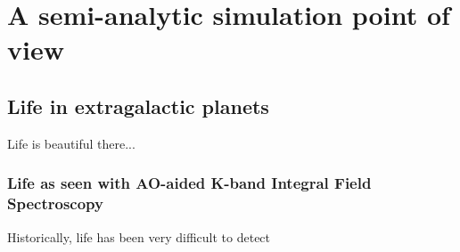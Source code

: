 \chapter{A semi-analytic simulation point of view}



\section{Life in extragalactic planets}

Life is beautiful there...

\subsection{Life as seen with AO-aided K-band Integral Field Spectroscopy}

Historically, life has been very difficult to detect

